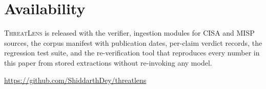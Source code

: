 \documentclass[10pt,twocolumn]{article}
\newcommand{\tool}{\textsc{ThreatLens}\xspace}
\begin{document}
\section{Availability}

\tool is released with the verifier, ingestion modules for CISA and MISP
sources, the corpus manifest with publication dates, per-claim verdict records,
the regression test suite, and the re-verification tool that reproduces every
number in this paper from stored extractions without re-invoking any model.
\begin{center}\small\url{https://github.com/ShiddarthDey/threatlens}\end{center}

\balance


\end{document}
